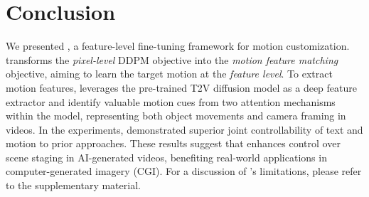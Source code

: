 \section{Conclusion}
\label{sec:conclusion}

We presented \ours, a feature-level fine-tuning framework for motion customization. {\ours} transforms the \emph{pixel-level} DDPM objective into the \emph{motion feature matching} objective, aiming to learn the target motion at the \emph{feature level}. To extract motion features, {\ours} leverages the pre-trained T2V diffusion model as a deep feature extractor and identify valuable motion cues from two attention mechanisms within the model, representing both object movements and camera framing in videos. In the experiments, {\ours} demonstrated superior joint controllability of text and motion to prior approaches. These results suggest that {\ours} enhances control over scene staging in AI-generated videos, benefiting  real-world applications in computer-generated imagery (CGI). For a discussion of {\ours}'s limitations, please refer to the supplementary material.
